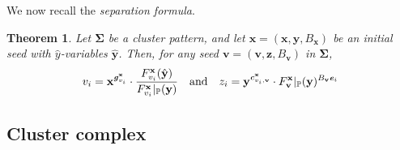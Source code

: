 \documentclass[11pt,reqno]{amsart}
\theoremstyle{plain}
\newtheorem{theorem}{Theorem}[section]
\theoremstyle{definition}
\numberwithin{equation}{section}
\newcommand\RR{\mathbb{R}}
\newcommand\<{\langle}
\renewcommand\>{\rangle}
\def\vv{\mathbf{v}}
\def\con{\sigma}
\newcommand{\bfit}[1]{\textbf{\textit{#1}}}
\def\PP{\mathbb{P}}
\def\seeds{\mathbf{\Sigma}}
\def\xx{\mathbf{x}}%
\def\yy{\mathbf{y}}%
\def\zz{\mathbf{z}}
\def\cvec{\bfit{c}}
\def\gvec{\bfit{g}}
\def\Gmat{{G}}
\def\Fpoly{{F}}
\newcommand{\Bgzp}[2]{\operatorname{Bgz}^{\uparrow}_{#2}(#1)}
\newcommand{\Bgzm}[2]{\operatorname{Bgz}^{\downarrow}_{#2}(#1)}
\begin{document}
We now recall the \emph{separation formula}.

\begin{theorem}\label{thm:CGF}\cite[\S3]{FZ07}
Let $\seeds$ be a cluster pattern, and let $\xx=(\xx,\yy,B_\xx)$ be an initial seed with $\hat{y}$-variables $\hat{\yy}$. Then, for any seed $\vv=(\vv,\zz,B_\vv)$ in $\seeds$,
\begin{gather}
    v_i=\xx^{\gvec^\xx_{v_i}}\cdot\frac{\Fpoly^\xx_{v_i}(\hat{\yy})}{\Fpoly^\xx_{v_i}|_{\PP}(\yy)}
    \quad\text{and}\quad
    z_i=\yy^{\cvec^\xx_{v_i,\vv}}\cdot\Fpoly^\xx_\vv|_{\PP}(\yy)^{B_\vv\bfit{e}_i}
\end{gather}
\end{theorem}






\subsection{Cluster complex}\



\end{document}
